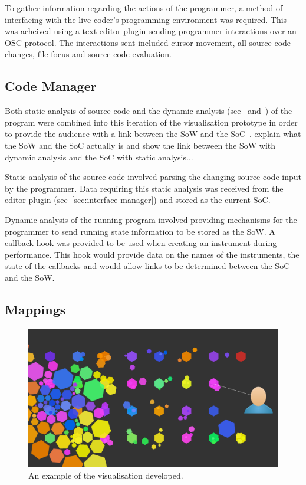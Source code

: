 To gather information regarding the actions of the programmer, a method of interfacing with the live coder's programming environment was required. This was acheived using a text editor plugin sending programmer interactions over an \ac{OSC} protocol. The interactions sent included cursor movement, all source code changes, file focus and source code evaluation.

\subsection{Code Manager}

Both static analysis of source code and the dynamic analysis (see~\cite{Eisenbarth2003} and~\cite{Jerding1997}) of the program were combined into this iteration of the visualisation prototype in order to provide the audience with a link between the \ac{SoW} and the \ac{SoC}~\cite{Swift2013}. {\color{red} explain what the \ac{SoW} and the \ac{SoC} actually is and show the link between the \ac{SoW} with dynamic analysis and the \ac{SoC} with static analysis...}

Static analysis of the source code involved parsing the changing source code input by the programmer. Data requiring this static analysis was received from the editor plugin (see~\ref{sec:interface-manager}) and stored as the current \ac{SoC}.

Dynamic analysis of the running program involved providing mechanisms for the programmer to send running state information to be stored as the \ac{SoW}. A callback hook was provided to be used when creating an instrument during performance. This hook would provide data on the names of the instruments, the state of the callbacks and would allow links to be determined between the \ac{SoC} and the \ac{SoW}.

\subsection{Mappings}

\begin{figure}
\centering
\includegraphics[width=\textwidth]{../images/final-visualisations/final-code-visualisation.png}
\caption[Prototype (second iteration) example]{An example of the visualisation developed.}
\label{fig:final-visualisation}
\end{figure}

